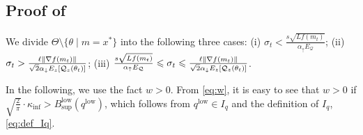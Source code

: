 \documentclass[journal]{IEEEtran}
\renewcommand{\leq}{\leqslant} %
\DeclarePairedDelimiter{\norm}{\lVert}{\rVert}
\theoremstyle{definition}
\newcommand{\yohe}[1]{{\color{cyan}Y.A.: #1}}
\newcommand{\indup}{\mathbb{I}_{\uparrow}}
\newcommand{\inddown}{\mathbb{I}_{\downarrow}}
\newcommand{\aup}{\alpha_{\uparrow}}
\newcommand{\adown}{\alpha_{\downarrow}}
\begin{document}



\subsection{Proof of }\label{apdx:cor:expected_potential_decrease}
We divide $\Theta\setminus\{\theta\mid m= x^*\}$ into the following three cases:
 (i) $\sigma_t < \frac{s\sqrt{L f(m_t)}}{\aup E_\mathcal{Q}}$; 
(ii) $\sigma_t > \frac{\ell \norm{\nabla f(m_t)}}{\sqrt{2} \adown  E_z[\mathcal{Q}_z(\theta_t)]}$;
(iii) $\frac{s\sqrt{L f(m_t)}}{\aup E_\mathcal{Q}} \leq \sigma_t \leq \frac{\ell \norm{\nabla f(m_t)}}{\sqrt{2} \adown  E_z[\mathcal{Q}_z(\theta_t)]}$.

In the following, we use the fact $w > 0$. 
From \eqref{eq:w}, it is easy to see that $w > 0$ if $\sqrt{\frac{2}{\pi}}\cdot\kappa_{\inf} > B_{\sup}^\mathrm{low}(q^\mathrm{low})$,  
which follows from $q^\mathrm{low} \in I_q$ and the definition of $I_q$, \eqref{eq:def_Iq}.
\end{document}
